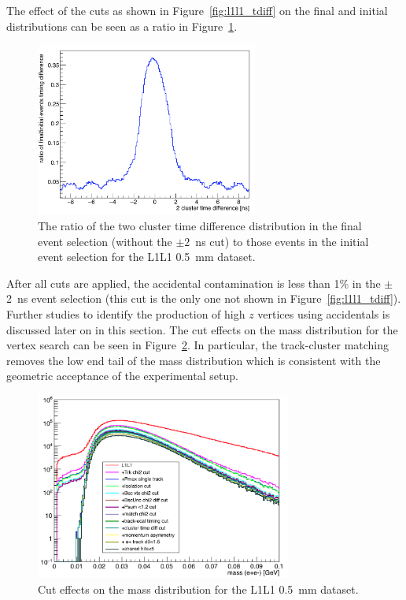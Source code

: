 The effect of the cuts as shown in Figure~\ref{fig:l1l1_tdiff} on the final and initial distributions can be seen as a ratio in Figure~\ref{fig:l1l1_tdiffR}.

\begin{figure}[htb]
  \centering
      \includegraphics[width=0.65\textwidth]{pics/searching/ratio_tdiff_cuts.png}
  \caption[Ratio of final to initial events, cluster time difference]{The ratio of the two cluster time difference distribution in the final event selection (without the $\pm2$~ns cut) to those events in the initial event selection for the L1L1 0.5~mm dataset.}
  \label{fig:l1l1_tdiffR}
\end{figure}

After all cuts are applied, the accidental contamination is less than 1$\%$ in the $\pm$ 2~ns event selection (this cut is the only one not shown in Figure~\ref{fig:l1l1_tdiff}). Further studies to identify the production of high $z$ vertices using accidentals is discussed later on in this section. The cut effects on the mass distribution for the vertex search can be seen in Figure~\ref{fig:l1l1_mass}. In particular, the track-cluster matching removes the low end tail of the mass distribution which is consistent with the geometric acceptance of the experimental setup.

\begin{figure}[htb]
  \centering
      \includegraphics[width=0.75\textwidth]{pics/searching/mass_L1L1_cuts.png}
  \caption[Cut effects on the mass distribution]{Cut effects on the mass distribution for the L1L1 0.5~mm dataset.}
  \label{fig:l1l1_mass}
\end{figure} 

